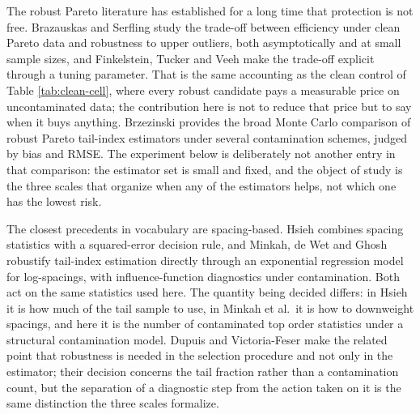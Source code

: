 \documentclass[11pt]{article}
\begin{document}
The robust Pareto literature has established for a long time that protection
is not free.  Brazauskas and Serfling
\citeyearpar{brazauskas-serfling-2000,brazauskas-serfling-2001} study the trade-off
between efficiency under clean Pareto data and robustness to upper outliers,
both asymptotically and at small sample sizes, and Finkelstein, Tucker and Veeh
\citeyearpar{finkelstein-tucker-veeh-2006} make the trade-off explicit through a
tuning parameter.  That is the same accounting as the clean control of Table
\ref{tab:clean-cell}, where every robust candidate pays a measurable price on
uncontaminated data; the contribution here is not to reduce that price but to
say when it buys anything.  Brzezinski \citeyearpar{brzezinski-2016} provides the
broad Monte Carlo comparison of robust Pareto tail-index estimators under
several contamination schemes, judged by bias and RMSE.  The experiment below
is deliberately not another entry in that comparison: the estimator set is
small and fixed, and the object of study is the three scales that organize when
any of the estimators helps, not which one has the lowest risk.

The closest precedents in vocabulary are spacing-based.  Hsieh
\citeyearpar{hsieh-1999} combines spacing statistics with a squared-error decision
rule, and Minkah, de Wet and Ghosh \citeyearpar{minkah-dewet-ghosh-2023} robustify
tail-index estimation directly through an exponential regression model for
log-spacings, with influence-function diagnostics under contamination.  Both
act on the same statistics used here.  The quantity being decided differs: in
Hsieh it is how much of the tail sample to use, in Minkah et al.\ it is how to
downweight spacings, and here it is the number of contaminated top order
statistics under a structural contamination model.  Dupuis and Victoria-Feser
\citeyearpar{dupuis-victoria-feser-2006} make the related point that robustness is
needed in the selection procedure and not only in the estimator; their decision
concerns the tail fraction rather than a contamination count, but the
separation of a diagnostic step from the action taken on it is the same
distinction the three scales formalize.
\end{document}
